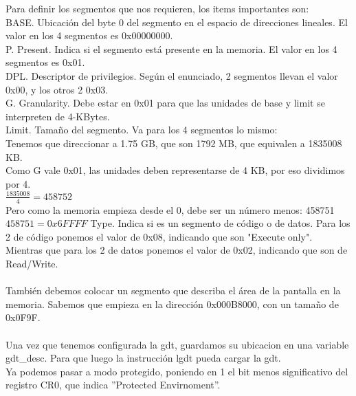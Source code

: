 Para definir los segmentos que nos requieren, los items importantes son:\\
BASE. Ubicaci\'on del byte 0 del segmento en el espacio de direcciones lineales. El valor en los 4 segmentos es 0x00000000.\\
P. Present. Indica si el segmento est\'a presente en la memoria. El valor en los 4 segmentos es 0x01.\\
DPL. Descriptor de privilegios. Seg\'un el enunciado, 2 segmentos llevan el valor 0x00, y los otros 2 0x03.\\
G. Granularity. Debe estar en 0x01 para que las unidades de base y limit se interpreten de 4-KBytes.\\
Limit. Tamaño del segmento. Va para los 4 segmentos lo mismo:\\
\indent Tenemos que direccionar a 1.75 GB, que son 1792 MB, que equivalen a 1835008 KB.\\
\indent Como G vale 0x01, las unidades deben representarse de 4 KB, por eso dividimos por 4.\\
\indent $\frac{1835008}{4} = 458752$\\
\indent Pero como la memoria empieza desde el 0, debe ser un n\'umero menos: 458751\\
\indent $458751 = 0x6FFFF$
Type. Indica si es un segmento de c\'odigo o de datos. Para los 2 de c\'odigo ponemos el valor de 0x08, indicando que son "Execute only". Mientras que para los 2 de datos ponemos el valor de 0x02, indicando que son de Read/Write.\\\\

Tambi\'en debemos colocar un segmento que describa el \'area de la pantalla en la memoria. Sabemos que empieza en la direcci\'on 0x000B8000, con un tamaño de 0x0F9F.\\\\

Una vez que tenemos configurada la gdt, guardamos su ubicacion en una variable gdt\_desc. Para que luego la instrucci\'on lgdt pueda cargar la gdt.\\
Ya podemos pasar a modo protegido, poniendo en 1 el bit menos significativo del registro CR0, que indica ''Protected Envirnoment''.
 

 